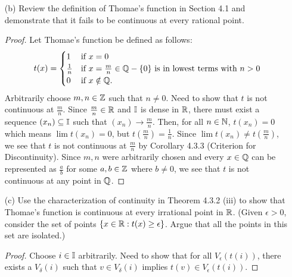 \documentclass[12pt,letterpaper]{article}
\begin{document}
\begin{itemize}[leftmargin=!,labelindent=5pt]
\begin{itemize}
\begin{proof}
                        Since $\bbR$ consists of points from $\bbQ$ and $\bbI$, we see that $\bbR$ is nowhere-continuous.
                    \end{proof}
                \item [(b)] Review the definition of Thomae’s function in Section 4.1 and demonstrate that it fails to be continuous at every rational point.
                    \begin{proof}
                        Let Thomae’s function be defined as follows:
                        \[ t(x) =
                        \begin{cases}
                            1 & \text{if } x = 0\\
                            \frac{1}{n} & \text{if } x = \frac{m}{n} \in \mathbb{Q} - \{0\} \text{ is in lowest terms with } n > 0\\
                            0 & \text{if } x \notin \mathbb{Q}.
                        \end{cases}
                        \]
                        Arbitrarily choose $m,n \in \mathbb{Z}$ such that $n\neq 0$.
                        Need to show that $t$ is not continuous at $\frac{m}{n}$. 
                        Since $\frac{m}{n} \in \mathbb{R}$ and $\bbI$ is dense in $\bbR$, there must exist a sequence $(x_n) \subseteq \mathbb{I}$ such that $(x_n) \to \frac{m}{n}$.
                        Then, for all $n \in \mathbb{N}$, $t(x_n) = 0$ which means $\lim t(x_n) = 0$, but $t(\frac{m}{n}) = \frac{1}{n}$.
                        Since $\lim t(x_n) \neq t(\frac{m}{n})$, we see that $t$ is not continuous at $\frac{m}{n}$ by Corollary 4.3.3 (Criterion for Discontinuity).
                        Since $m,n$ were arbitrarily chosen and every $x \in \mathbb{Q}$ can be represented as $\frac{a}{b}$ for some $a,b \in \mathbb{Z}$ where $b \neq 0$, we see that $t$ is not continuous at any point in $\bbQ$.
                    \end{proof}
                \item [(c)] Use the characterization of continuity in Theorem 4.3.2 (iii) to show that Thomae’s function is continuous at every irrational point in $\bbR$. (Given $\epsilon > 0$, consider the set of points $\{x \in \mathbb{R} : t(x) \geq \epsilon\}$. Argue that all the points in this set are isolated.)
                    \begin{proof}
                        Choose $i \in \mathbb{I}$ arbitrarily.
                        Need to show that for all $V_\epsilon(t(i))$, there exists a $V_\delta(i)$ such that $v \in V_\delta(i)$ implies $t(v) \in V_\epsilon(t(i))$.

\end{proof}
\end{itemize}
\end{itemize}
\end{document}
